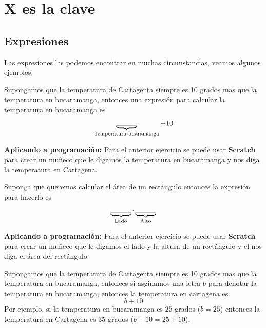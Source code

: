 \chapter{X es la clave}\label{chapter:reglasAritmeticas}

\section{Expresiones}\label{section:expresiones}
Las expresiones las podemos encontrar en muchas circunstancias, veamos algunos ejemplos.

\begin{ejemplo}
	Supongamos que la temperatura de Cartagenta siempre es 10 grados mas que la temperatura en bucaramanga, entonces una expresión para calcular la temperatura en bucaramanga es 
	\[
	\underbrace{\rule{10mm}{0.15mm}}_{\text{Temperatura buaramanga}} + 10 
	\]
\end{ejemplo}

\begin{tcolorbox}[colback=black!5!white,colframe=black]
	\textbf{Aplicando a programación:}
	Para el anterior ejercicio se puede usar \textbf{Scratch} para crear un muñeco que le digamos la temperatura en bucaramanga y nos diga la temperatura en Cartagena.
\end{tcolorbox}

\begin{ejemplo}
	Suponga que queremos calcular el área de un rectángulo entonces la expresión para hacerlo es 
	\[
	\underbrace{\rule{10mm}{0.15mm}}_{\text{Lado}} \cdot \underbrace{\rule{10mm}{0.15mm}}_{\text{Alto}}
	\]	
\end{ejemplo}

\begin{tcolorbox}[colback=black!5!white,colframe=black]
	\textbf{Aplicando a programación:}
	Para el anterior ejercicio se puede usar \textbf{Scratch} para crear un muñeco que le digamos el lado y la altura de un rectángulo y el nos diga el área del rectángulo
\end{tcolorbox}


\begin{ejemplo}
	Supongamos que la temperatura de Cartagenta siempre es 10 grados mas que la temperatura en bucaramanga, entonces si asginamos una letra $b$ para denotar la temperatura en bucaramanga, entonces la temperatura en cartagena es 
	\[
	b + 10 
	\]
	Por ejemplo, si la temperatura en bucaramanga es $25$ grados ($b=25$) entonces la temperatura en Cartagena es $35$ grados ($b+10=25+10$).
\end{ejemplo}

